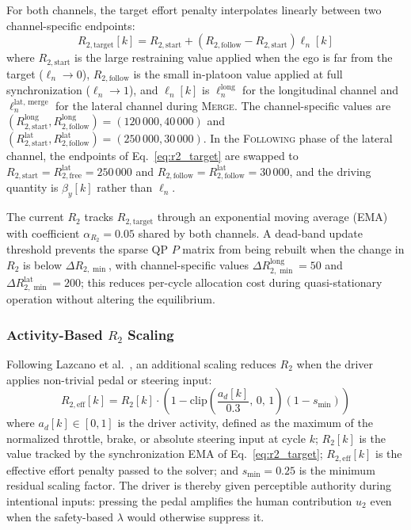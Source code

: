 \documentclass[12pt,a4paper,oneside]{report}
\begin{document}
For both channels, the target effort penalty interpolates linearly between two channel-specific endpoints:
\begin{equation}
R_{2,\text{target}}[k] = R_{2,\text{start}} + \left( R_{2,\text{follow}} - R_{2,\text{start}} \right) \ell_n[k]
\label{eq:r2_target}
\end{equation}
where $R_{2,\text{start}}$ is the large restraining value applied when the ego is far from the target ($\ell_n \to 0$), $R_{2,\text{follow}}$ is the small in-platoon value applied at full synchronization ($\ell_n \to 1$), and $\ell_n[k]$ is $\ell_n^{\text{long}}$ for the longitudinal channel and $\ell_n^{\text{lat, merge}}$ for the lateral channel during \textsc{Merge}. The channel-specific values are $(R_{2,\text{start}}^{\text{long}}, R_{2,\text{follow}}^{\text{long}}) = (120\,000, 40\,000)$ and $(R_{2,\text{start}}^{\text{lat}}, R_{2,\text{follow}}^{\text{lat}}) = (250\,000, 30\,000)$. In the \textsc{Following} phase of the lateral channel, the endpoints of Eq.~\eqref{eq:r2_target} are swapped to $R_{2,\text{start}} = R_{2,\text{free}}^{\text{lat}} = 250\,000$ and $R_{2,\text{follow}} = R_{2,\text{follow}}^{\text{lat}} = 30\,000$, and the driving quantity is $\beta_y[k]$ rather than $\ell_n$.

The current $R_2$ tracks $R_{2,\text{target}}$ through an exponential moving average (EMA) with coefficient $\alpha_{R_2} = 0.05$ shared by both channels. A dead-band update threshold prevents the sparse QP $P$ matrix from being rebuilt when the change in $R_2$ is below $\Delta R_{2,\min}$, with channel-specific values $\Delta R_{2,\min}^{\text{long}} = 50$ and $\Delta R_{2,\min}^{\text{lat}} = 200$; this reduces per-cycle allocation cost during quasi-stationary operation without altering the equilibrium.

\subsubsection{Activity-Based $R_2$ Scaling}

Following Lazcano et al.~\cite{lazcanoMPCBasedHapticShared2021}, an additional scaling reduces $R_2$ when the driver applies non-trivial pedal or steering input:
\begin{equation}
R_{2,\text{eff}}[k] = R_2[k] \cdot \left( 1 - \mathrm{clip}\!\left( \frac{a_d[k]}{0.3}, \, 0, \, 1 \right) \left( 1 - s_{\min} \right) \right)
\label{eq:r2_activity}
\end{equation}
where $a_d[k] \in [0, 1]$ is the driver activity, defined as the maximum of the normalized throttle, brake, or absolute steering input at cycle $k$; $R_2[k]$ is the value tracked by the synchronization EMA of Eq.~\eqref{eq:r2_target}; $R_{2,\text{eff}}[k]$ is the effective effort penalty passed to the solver; and $s_{\min} = 0.25$ is the minimum residual scaling factor. The driver is thereby given perceptible authority during intentional inputs: pressing the pedal amplifies the human contribution $u_2$ even when the safety-based $\lambda$ would otherwise suppress it.
\end{document}
